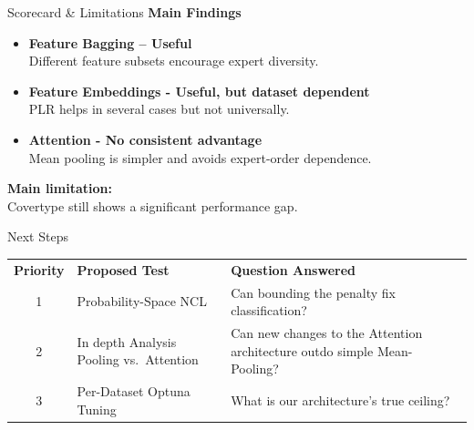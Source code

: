 \documentclass[aspectratio=169, xcolor=table]{beamer}
\begin{document}
\begin{frame}{Scorecard \& Limitations}
    \textbf{Main Findings}
    \vspace{0.3cm}
    \begin{itemize}
        \setlength\itemsep{0.4em}
        \item \textbf{Feature Bagging -- Useful} \\ Different feature subsets encourage expert diversity.
        \item \textbf{Feature Embeddings - Useful, but dataset dependent} \\ PLR helps in several cases but not universally.
        \item \textbf{Attention - No consistent advantage} \\ Mean pooling is simpler and avoids expert-order dependence.
    \end{itemize}
    \vspace{0.4cm}
    \textbf{Main limitation:} \\
    Covertype still shows a significant performance gap.
\end{frame}

\begin{frame}{Next Steps}
    \begin{table}
        \centering
        \renewcommand{\arraystretch}{1.4}
        \small
        \begin{tabular}{c | m{4.2cm} | m{6.3cm}}
            \rowcolor{PrimaryColor} \color{white}\textbf{Priority} & \color{white}\textbf{Proposed Test} & \color{white}\textbf{Question Answered} \\
            1 & Probability-Space NCL & Can bounding the penalty fix classification? \\
            \rowcolor{LightGrey} 2 & In depth Analysis Pooling vs.\ Attention & Can new changes to the Attention architecture outdo simple Mean-Pooling? \\
            3 & Per-Dataset Optuna Tuning & What is our architecture's true ceiling? \\
        \end{tabular}
    \end{table}
\end{frame}
\end{document}
